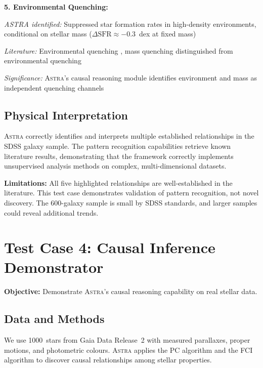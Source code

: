 \documentclass[usenatbib]{rasti}
\newcommand{\astra}{\textsc{Astra}\xspace}
\newcommand{\pc}{PC\xspace}
\newcommand{\fci}{FCI\xspace}
\begin{document}
\textbf{5. Environmental Quenching:}
\begin{description}
  \item \emph{ASTRA identified:} Suppressed star formation rates in high-density environments, conditional on stellar mass ($\Delta\mathrm{SFR} \approx -0.3$~dex at fixed mass)
  \item \emph{Literature:} Environmental quenching \citep{Peng2010}, mass quenching distinguished from environmental quenching
  \item \emph{Significance:} \astra's causal reasoning module identifies environment and mass as independent quenching channels
\end{description}

\subsection{Physical Interpretation}
\label{sec:tc3:interpretation}

\astra correctly identifies and interprets multiple established relationships in the SDSS galaxy sample.
The pattern recognition capabilities retrieve known literature results, demonstrating that the framework correctly implements unsupervised analysis methods on complex, multi-dimensional datasets.

\textbf{Limitations:} All five highlighted relationships are well-established in the literature.
This test case demonstrates validation of pattern recognition, not novel discovery.
The 600-galaxy sample is small by SDSS standards, and larger samples could reveal additional trends.

\section{Test Case 4: Causal Inference Demonstrator}
\label{sec:tc4}

\textbf{Objective:} Demonstrate \astra's causal reasoning capability on real stellar data.

\subsection{Data and Methods}
\label{sec:tc4:data}

We use 1000~stars from Gaia Data Release~2 \citep{GaiaCollaboration2018} with measured parallaxes, proper motions, and photometric colours.
\astra applies the \pc algorithm \citep{Spirtes2000} and the \fci algorithm \citep{Zhang2008} to discover causal relationships among stellar properties.
\end{document}
